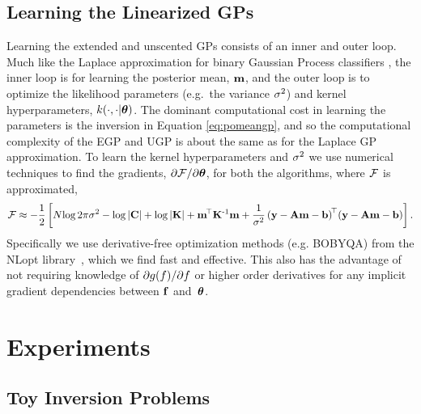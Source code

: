 \documentclass{article} %
\begin{document}
\subsection{Learning the Linearized GPs}

Learning the extended and unscented GPs consists of  an inner and outer loop.
Much like the Laplace approximation for binary Gaussian Process classifiers
\cite{Rasmussen2006}, the inner loop is for learning the posterior mean,
$\mathbf{m}$, and the outer loop is to optimize the likelihood parameters
(e.g.~the variance $\sigma^2$) and kernel hyperparameters,
$k\!\left({{\cdot}, {\cdot|\boldsymbol\theta}}\right)$. The dominant computational cost in learning
the parameters is the inversion in Equation \eqref{eq:pomeangp}, and so the
computational complexity of the EGP and UGP is about the same as for the
Laplace GP approximation.
%
To learn the kernel hyperparameters and $\sigma^2$ we use numerical techniques
to find the gradients, $\partial\mathcal{F}/\partial\boldsymbol\theta$, for both the
algorithms, where $\mathcal{F}$ is approximated,
\begin{equation}
    \mathcal{F} \approx - \frac{1}{2} \left[
    N\!\log{2\pi\ensuremath{\sigma^2}}
    - \log\left|{\mathbf{C}}\right|
    + \log\left|{\mathbf{K}}\right|
    + \mathbf{m}^{\!\top}\mathbf{K}^{\text{-}1} \mathbf{m}
    + \frac{1}{\sigma^2}
        \left({\mathbf{y} - \mathbf{A}\mathbf{m} - \mathbf{b}}\right)^{\!\top}\!
        \left({\mathbf{y} - \mathbf{A}\mathbf{m} - \mathbf{b}}\right)
    \right].
    \label{eq:fengygp}
\end{equation}
Specifically we use derivative-free optimization methods (e.g. BOBYQA) from
the NLopt library~\cite{JohnsonNLOPT}, which we find fast and effective. This
also has the advantage of not requiring knowledge of
$\partial g\!\left({{f}}\right)\!/\partial f$ or higher order derivatives for
any implicit gradient dependencies between $\mathbf{f}$ and~$\boldsymbol\theta$. 


\section{Experiments}
\label{sec:experiments}
%
%
%
%
\subsection{Toy Inversion Problems}
\label{sec:exptoy}
\end{document}
